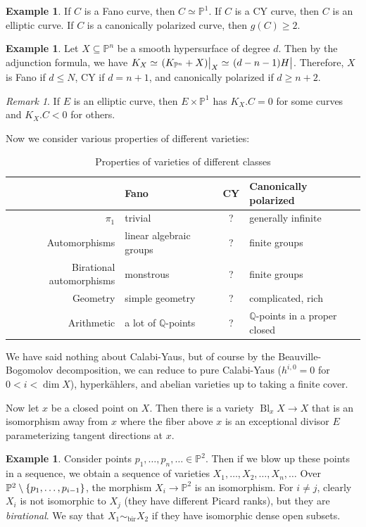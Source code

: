 \documentclass[leqno, openany]{memoir}
\theoremstyle{definition}
\newtheorem{exm}[thm]{Example}
\theoremstyle{remark}
\newtheorem{rmk}[thm]{Remark}
\theoremstyle{plain}
\theoremstyle{definition}
\theoremstyle{remark}
\newcommand{\Q}{\mathbb{Q}}
\renewcommand{\P}{\mathbb{P}}
\newcommand{\mr}[1]{\mathrm{#1}}
\newcommand{\bir}{\sim_{\mr{bir}}}
\DeclareMathOperator{\Bl}{Bl}
\begin{document}
\begin{exm}
    If $C$ is a Fano curve, then $C \simeq \P^1$. If $C$ is a CY curve, then $C$ is an elliptic curve. If $C$ is a canonically polarized curve, then $g(C) \geq 2$.
\end{exm}

\begin{exm}
    Let $X \subseteq \P^n$ be a smooth hypersurface of degree $d$. Then by the adjunction formula, we have $K_X \simeq \eval{(K_{\P^n} + X)}_X \simeq \eval{(d-n-1)H}$. Therefore, $X$ is Fano if $d \leq N$, CY if $d = n+1$, and canonically polarized if $d \geq n+2$.
\end{exm}

\begin{rmk}
    If $E$ is an elliptic curve, then $E \times \P^1$ has $K_X . C = 0$ for some curves and $K_X . C < 0$ for others.
\end{rmk}

Now we consider various properties of different varieties:
\begin{table}[H]
    \centering
    \caption{Properties of varieties of different classes}
    \label{tab:label}
    \begin{tabular}{rlcl}
    \toprule
    & Fano & CY & Canonically polarized \\
    \midrule
        $\pi_1$ & trivial & {?} & generally infinite \\
        Automorphisms & linear algebraic groups & {?} & finite groups \\
        Birational automorphisms & monstrous & {?} & finite groups \\
        Geometry & simple geometry & {?} & complicated, rich \\
        Arithmetic & a lot of $\Q$-points & {?} & $\Q$-points in a proper closed \\
        \bottomrule
    \end{tabular}
\end{table}
We have said nothing about Calabi-Yaus, but of course by the Beauville-Bogomolov decomposition, we can reduce to pure Calabi-Yaus ($h^{i,0} = 0$ for $0 < i < \dim X$), hyperk\"ahlers, and abelian varieties up to taking a finite cover.

Now let $x$ be a closed point on $X$. Then there is a variety $\Bl_x X \to X$ that is an isomorphism away from $x$ where the fiber above $x$ is an exceptional divisor $E$ parameterizing tangent directions at $x$.

\begin{exm}
    Consider points $p_1, \ldots, p_n, \ldots \in \P^2$. Then if we blow up these points in a sequence, we obtain a sequence of varieties $X_1, \ldots, X_2, \ldots, X_n, \ldots$ Over $\P^2 \setminus \qty{p_1, \ldots, p_{i-1}}$, the morphism $X_i \to \P^2$ is an isomorphism. For $i \neq j$, clearly $X_i$ is not isomorphic to $X_j$ (they have different Picard ranks), but they are \textit{birational}. We say that $X_1 \bir X_2$ if they have isomorphic dense open subsets.
\end{exm}
\end{document}
